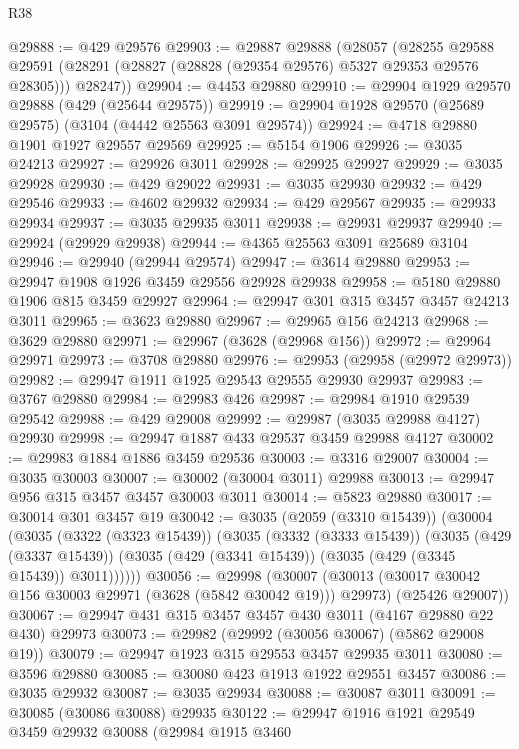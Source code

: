 \begin{lexlean}{R38}
\begin{coremodule}
@29888 := @429 @29576
@29903 := @29887
    @29888
    (@28057
      (@28255
        @29588
        @29591
        (@28291 (@28827 (@28828 (@29354 @29576) @5327 @29353 @29576 @28305)))
        @28247))
@29904 := @4453 @29880
@29910 := @29904 @1929 @29570 @29888 (@429 (@25644 @29575))
@29919 := @29904 @1928 @29570 (@25689 @29575) (@3104 (@4442 @25563 @3091 @29574))
@29924 := @4718 @29880 @1901 @1927 @29557 @29569
@29925 := @5154 @1906
@29926 := @3035 @24213
@29927 := @29926 @3011
@29928 := @29925 @29927
@29929 := @3035 @29928
@29930 := @429 @29022
@29931 := @3035 @29930
@29932 := @429 @29546
@29933 := @4602 @29932
@29934 := @429 @29567
@29935 := @29933 @29934
@29937 := @3035 @29935 @3011
@29938 := @29931 @29937
@29940 := @29924 (@29929 @29938)
@29944 := @4365 @25563 @3091 @25689 @3104
@29946 := @29940 (@29944 @29574)
@29947 := @3614 @29880
@29953 := @29947 @1908 @1926 @3459 @29556 @29928 @29938
@29958 := @5180 @29880 @1906 @815 @3459 @29927
@29964 := @29947 @301 @315 @3457 @3457 @24213 @3011
@29965 := @3623 @29880
@29967 := @29965 @156 @24213
@29968 := @3629 @29880
@29971 := @29967 (@3628 (@29968 @156))
@29972 := @29964 @29971
@29973 := @3708 @29880
@29976 := @29953 (@29958 (@29972 @29973))
@29982 := @29947 @1911 @1925 @29543 @29555 @29930 @29937
@29983 := @3767 @29880
@29984 := @29983 @426
@29987 := @29984 @1910 @29539 @29542
@29988 := @429 @29008
@29992 := @29987 (@3035 @29988 @4127) @29930
@29998 := @29947 @1887 @433 @29537 @3459 @29988 @4127
@30002 := @29983 @1884 @1886 @3459 @29536
@30003 := @3316 @29007
@30004 := @3035 @30003
@30007 := @30002 (@30004 @3011) @29988
@30013 := @29947 @956 @315 @3457 @3457 @30003 @3011
@30014 := @5823 @29880
@30017 := @30014 @301 @3457 @19
@30042 := @3035
    (@2059 (@3310 @15439))
    (@30004
      (@3035
        (@3322 (@3323 @15439))
        (@3035
          (@3332 (@3333 @15439))
          (@3035
            (@429 (@3337 @15439))
            (@3035 (@429 (@3341 @15439)) (@3035 (@429 (@3345 @15439)) @3011))))))
@30056 := @29998
    (@30007
      (@30013 (@30017 @30042 @156 @30003 @29971 (@3628 (@5842 @30042 @19))) @29973)
      (@25426 @29007))
@30067 := @29947 @431 @315 @3457 @3457 @430 @3011 (@4167 @29880 @22 @430) @29973
@30073 := @29982 (@29992 (@30056 @30067) (@5862 @29008 @19))
@30079 := @29947 @1923 @315 @29553 @3457 @29935 @3011
@30080 := @3596 @29880
@30085 := @30080 @423 @1913 @1922 @29551 @3457
@30086 := @3035 @29932
@30087 := @3035 @29934
@30088 := @30087 @3011
@30091 := @30085 (@30086 @30088) @29935
@30122 := @29947
    @1916
    @1921
    @29549
    @3459
    @29932
    @30088
    (@29984
      @1915
      @3460

\end{coremodule}
\end{lexlean}
